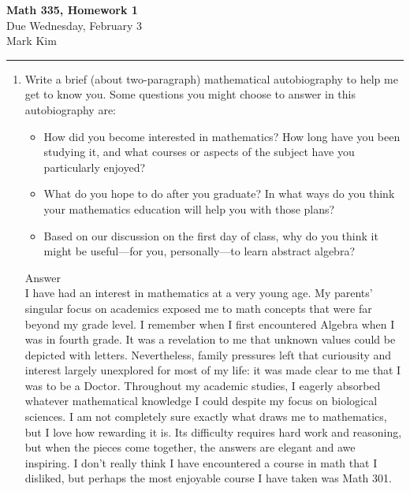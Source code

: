 \documentclass[11pt,twoside]{article}
\begin{document}
\begin{center}
{\bf \Large Math 335, Homework 1}\\
\vspace{0.1in}
{\Large Due Wednesday, February 3}\\
\vspace{0.5cm}
Mark Kim
\vspace{0.1cm}
\end{center}

\hrule

\vspace{.2in}

\begin{enumerate}

\item Write a brief (about two-paragraph) mathematical autobiography to help me get to know you.  Some questions you might choose to answer in this autobiography are:
\begin{itemize}
\item How did you become interested in mathematics?  How long have you been studying it, and what courses or aspects of the subject have you particularly enjoyed?
\item What do you hope to do after you graduate?  In what ways do you think your mathematics education will help you with those plans?
\item Based on our discussion on the first day of class, why do you think it might be useful---for you, personally---to learn abstract algebra?
\end{itemize}

{\color{red}Answer}\\
I have had an interest in mathematics at a very young age.  My parents' singular focus on academics exposed me to math concepts that were far beyond my grade level.  I remember when I first encountered Algebra when I was in fourth grade.  It was a revelation to me that unknown values could be depicted with letters.  Nevertheless, family pressures left that curiousity and interest largely unexplored for most of my life: it was made clear to me that I was to be a Doctor.  Throughout my academic studies, I eagerly absorbed whatever mathematical knowledge I could despite my focus on biological sciences.  I am not completely sure exactly what draws me to mathematics, but I love how rewarding it is.  Its difficulty requires hard work and reasoning, but when the pieces come together, the answers are elegant and awe inspiring.  I don't really think I have encountered a course in math that I disliked, but perhaps the most enjoyable course I have taken was Math 301.


\end{enumerate}
\end{document}
